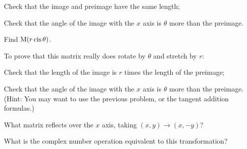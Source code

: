\documentclass[../gatm_answers.tex]{subfiles}
\begin{document}
\begin{iinner_problem}[start=1]
\item Check that the image and preimage have the same length;
\end{iinner_problem}

\begin{iinner_problem}
\item Check that the angle of the image with the $x$ axis is $\theta$ more than the preimage.
\end{iinner_problem}

\begin{outer_problem}
\item 
\end{outer_problem}

\begin{inner_problem}[start=1]
\item Find $\operatorname{M} (r\operatorname{cis}\theta)$.
\end{inner_problem}

\begin{inner_problem}
\item To prove that this matrix really does rotate by $\theta$ and stretch by $r$:
\end{inner_problem}

\begin{iinner_problem}[start=1]
\item Check that the length of the image is $r$ times the length of the preimage;
\end{iinner_problem}

\begin{iinner_problem}
\item Check that the angle of the image with the $x$ axis is $\theta$ more than the preimage. (Hint: You may want to use the previous problem, or the tangent addition formulas.)
\end{iinner_problem}

\begin{outer_problem}
\item 
\end{outer_problem}

\begin{inner_problem}[start=1]
\item What matrix reflects over the $x$ axis, taking $(x,y)\to (x,-y)$?
\end{inner_problem}

\begin{inner_problem}
\item What is the complex number operation equivalent to this transformation?
\end{inner_problem}
\end{document}
